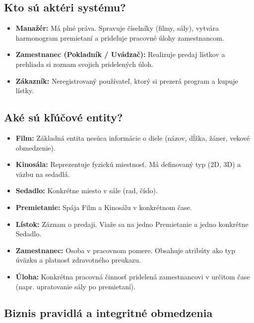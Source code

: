 \documentclass[11pt, a4paper]{article}
\begin{document}
\subsection{Kto sú aktéri systému?}
\begin{itemize}
    \item \textbf{Manažér:} Má plné práva. Spravuje číselníky (filmy, sály), vytvára harmonogram premietaní a prideľuje pracovné úlohy zamestnancom.
    \item \textbf{Zamestnanec (Pokladník / Uvádzač):} Realizuje predaj lístkov a prehliada si zoznam svojich pridelených úloh.
    \item \textbf{Zákazník:} Neregistrovaný používateľ, ktorý si prezerá program a kupuje lístky.
\end{itemize}

\subsection{Aké sú kľúčové entity?}
\begin{itemize}
    \item \textbf{Film:} Základná entita nesúca informácie o diele (názov, dĺžka, žáner, vekové obmedzenie).
    \item \textbf{Kinosála:} Reprezentuje fyzickú miestnosť. Má definovaný typ (2D, 3D) a väzbu na sedadlá.
    \item \textbf{Sedadlo:} Konkrétne miesto v sále (rad, číslo).
    \item \textbf{Premietanie:} Spája Film a Kinosálu v konkrétnom čase.
    \item \textbf{Lístok:} Záznam o predaji. Viaže sa na jedno Premietanie a jedno konkrétne Sedadlo.
    \item \textbf{Zamestnanec:} Osoba v pracovnom pomere. Obsahuje atribúty ako typ úväzku a platnosť zdravotného preukazu.
    \item \textbf{Úloha:} Konkrétna pracovná činnosť pridelená zamestnancovi v určitom čase (napr. upratovanie sály po premietaní).
\end{itemize}

\subsection{Biznis pravidlá a integritné obmedzenia}
\end{document}
